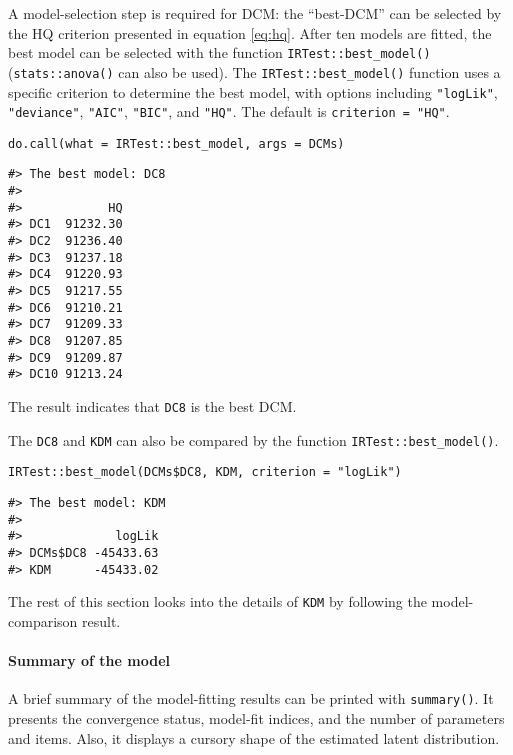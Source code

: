 A model-selection step is required for DCM: the ``best-DCM'' can be
selected by the HQ criterion \citep{Hannan+Quinn:1979} presented in
equation \eqref{eq:hq}. After ten models are fitted, the best model can
be selected with the function \texttt{IRTest::best\_model()} (\texttt{stats::anova()} can also be
used). The \texttt{IRTest::best\_model()} function uses a specific criterion
to determine the best model, with options including \texttt{"logLik"}, \texttt{"deviance"}, \texttt{"AIC"},
\texttt{"BIC"}, and \texttt{"HQ"}. The default is \texttt{criterion\ =\ "HQ"}.

\begin{verbatim}
do.call(what = IRTest::best_model, args = DCMs)
\end{verbatim}

\begin{verbatim}
#> The best model: DC8 
#> 
#>            HQ
#> DC1  91232.30
#> DC2  91236.40
#> DC3  91237.18
#> DC4  91220.93
#> DC5  91217.55
#> DC6  91210.21
#> DC7  91209.33
#> DC8  91207.85
#> DC9  91209.87
#> DC10 91213.24
\end{verbatim}

The result indicates that \texttt{DC8} is the best DCM.

The \texttt{DC8} and \texttt{KDM} can also be compared by the function
\texttt{IRTest::best\_model()}.

\begin{verbatim}
IRTest::best_model(DCMs$DC8, KDM, criterion = "logLik")
\end{verbatim}

\begin{verbatim}
#> The best model: KDM 
#> 
#>             logLik
#> DCMs$DC8 -45433.63
#> KDM      -45433.02
\end{verbatim}

The rest of this section looks into the details of \texttt{KDM} by following
the model-comparison result.

\hypertarget{summary-of-the-model}{%
\paragraph{Summary of the model}\label{summary-of-the-model}}

A brief summary of the model-fitting results can be printed with
\texttt{summary()}. It presents the convergence status, model-fit indices, and the
number of parameters and items. Also, it displays a cursory shape of the
estimated latent distribution.

